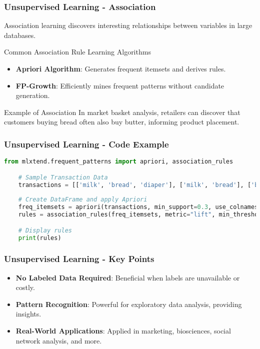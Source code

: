 \documentclass[aspectratio=169]{beamer}
\begin{document}
\begin{frame}[fragile]
    \frametitle{Unsupervised Learning - Association}
    Association learning discovers interesting relationships between variables in large databases.
  
    \begin{block}{Common Association Rule Learning Algorithms}
        \begin{itemize}
            \item \textbf{Apriori Algorithm}: Generates frequent itemsets and derives rules.
            \item \textbf{FP-Growth}: Efficiently mines frequent patterns without candidate generation.
        \end{itemize}
    \end{block}

    \begin{block}{Example of Association}
        In market basket analysis, retailers can discover that customers buying bread often also buy butter, informing product placement.
    \end{block}
\end{frame}

\begin{frame}[fragile]
    \frametitle{Unsupervised Learning - Code Example}
    \begin{lstlisting}[language=Python]
    from mlxtend.frequent_patterns import apriori, association_rules

    # Sample Transaction Data
    transactions = [['milk', 'bread', 'diaper'], ['milk', 'bread'], ['bread', 'diaper']]
    
    # Create DataFrame and apply Apriori
    freq_itemsets = apriori(transactions, min_support=0.3, use_colnames=True)
    rules = association_rules(freq_itemsets, metric="lift", min_threshold=1)

    # Display rules
    print(rules)
    \end{lstlisting}
\end{frame}

\begin{frame}[fragile]
    \frametitle{Unsupervised Learning - Key Points}
    \begin{itemize}
        \item \textbf{No Labeled Data Required}: Beneficial when labels are unavailable or costly.
        \item \textbf{Pattern Recognition}: Powerful for exploratory data analysis, providing insights.
        \item \textbf{Real-World Applications}: Applied in marketing, biosciences, social network analysis, and more.
    \end{itemize}
\end{frame}
\end{document}
